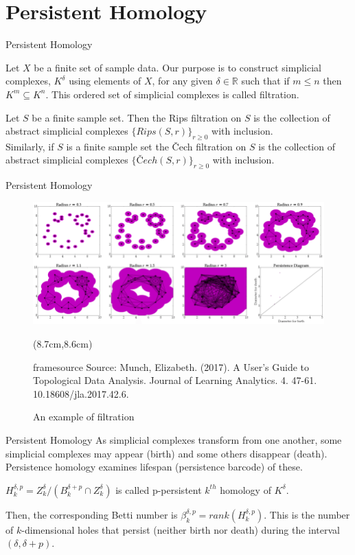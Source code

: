 \documentclass{beamer}
\newcommand{\source}[1]{\begin{textblock*}{4cm}(8.7cm,8.6cm)
    \begin{beamercolorbox}[ht=0.5cm,right]{framesource}
        \usebeamerfont{framesource}\usebeamercolor[fg]{framesource} Source: {#1}
    \end{beamercolorbox}
\end{textblock*}}
\begin{document}
\section{Persistent Homology}
\begin{frame}{Persistent Homology}
    \begin{definition}  
        Let $X$ be a finite set of sample data. Our purpose is to construct simplicial complexes, $K^{\delta}$ using elements of $X$, for any given $\delta \in \mathbb{R}$ such that if $m \leq n$ then $K^m \subseteq K^n$. This ordered set of simplicial complexes is called \textcolor{myred}{filtration}.    
    \end{definition}
    \vspace{0.5cm}
    Let $S$ be a finite sample set. Then \textcolor{myred}{the Rips filtration} on $S$ is the collection of abstract simplicial complexes $\{Rips(S,r)\}_{r \geq 0}$ with inclusion.\\
    \vspace{0.5cm}
    Similarly, if $S$ is a finite sample set \textcolor{myred}{the Čech filtration} on $S$ is the collection of abstract simplicial complexes $\{\textit{Č}ech(S,r)\}_{r \geq 0}$ with inclusion.
\end{frame}

\begin{frame}{Persistent Homology}
    \begin{figure}
        \includegraphics[scale=0.4]{./example.png}
        \source{Munch, Elizabeth. (2017). A User’s Guide to Topological Data Analysis. Journal of Learning Analytics. 4. 47-61. 10.18608/jla.2017.42.6. }
        \caption{An example of filtration}
    \end{figure}
\end{frame}

\begin{frame}{Persistent Homology}
    As simplicial complexes transform from one another, some simplicial complexes may appear (birth) and some others disappear (death). Persistence homology examines lifespan (\textcolor{myred}{persistence barcode}) of these.
    \begin{definition} 
        $H^{\delta,p}_k = Z^{\delta}_k/(B^{\delta+p}_k \cap Z^{\delta}_k)$ is called \textcolor{myred}{p-persistent $k^{th}$ homology} of $K^{\delta}$. \\
    \end{definition}
    Then, the corresponding Betti number is $\beta^{\delta,p}_k=rank(H^{\delta,p}_k)$. This is the number of $k$-dimensional holes that persist (neither birth nor death) during the interval $(\delta,\delta+p)$.
\end{frame}
\end{document}
